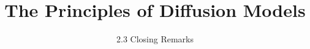 ﻿%

\title{The Principles of Diffusion Models}
\subtitle{2.3 Closing Remarks}


\begin{frame}
    \titlepage
\end{frame}


